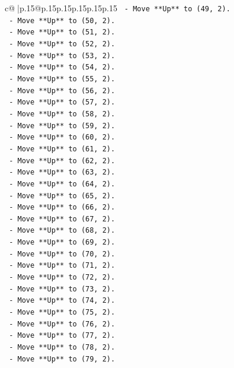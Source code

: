 \documentclass{article}
\begin{document}
{\begin{supertabular}{c@{$\;$}|p{.15\linewidth}@{}p{.15\linewidth}p{.15\linewidth}p{.15\linewidth}p{.15\linewidth}p{.15\linewidth}}
{{{\texttt{    {-} Move **Up** to (49, 2).} \\
\texttt{    {-} Move **Up** to (50, 2).} \\
\texttt{    {-} Move **Up** to (51, 2).} \\
\texttt{    {-} Move **Up** to (52, 2).} \\
\texttt{    {-} Move **Up** to (53, 2).} \\
\texttt{    {-} Move **Up** to (54, 2).} \\
\texttt{    {-} Move **Up** to (55, 2).} \\
\texttt{    {-} Move **Up** to (56, 2).} \\
\texttt{    {-} Move **Up** to (57, 2).} \\
\texttt{    {-} Move **Up** to (58, 2).} \\
\texttt{    {-} Move **Up** to (59, 2).} \\
\texttt{    {-} Move **Up** to (60, 2).} \\
\texttt{    {-} Move **Up** to (61, 2).} \\
\texttt{    {-} Move **Up** to (62, 2).} \\
\texttt{    {-} Move **Up** to (63, 2).} \\
\texttt{    {-} Move **Up** to (64, 2).} \\
\texttt{    {-} Move **Up** to (65, 2).} \\
\texttt{    {-} Move **Up** to (66, 2).} \\
\texttt{    {-} Move **Up** to (67, 2).} \\
\texttt{    {-} Move **Up** to (68, 2).} \\
\texttt{    {-} Move **Up** to (69, 2).} \\
\texttt{    {-} Move **Up** to (70, 2).} \\
\texttt{    {-} Move **Up** to (71, 2).} \\
\texttt{    {-} Move **Up** to (72, 2).} \\
\texttt{    {-} Move **Up** to (73, 2).} \\
\texttt{    {-} Move **Up** to (74, 2).} \\
\texttt{    {-} Move **Up** to (75, 2).} \\
\texttt{    {-} Move **Up** to (76, 2).} \\
\texttt{    {-} Move **Up** to (77, 2).} \\
\texttt{    {-} Move **Up** to (78, 2).} \\
\texttt{    {-} Move **Up** to (79, 2).} \\
}}}
\end{supertabular}}
\end{document}
